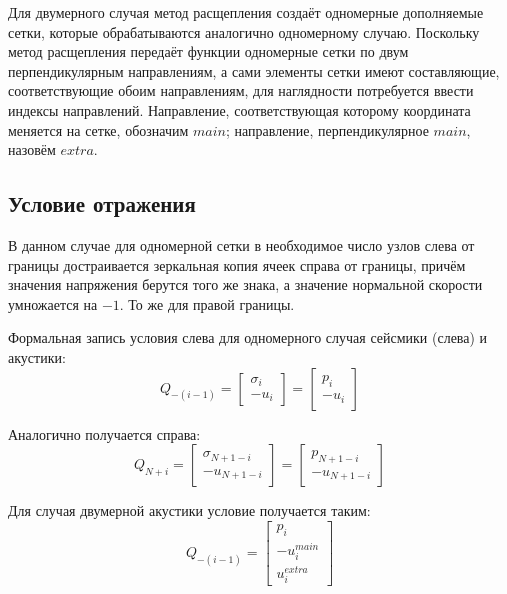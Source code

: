 \documentclass{article}
\begin{document}
\indent
Для двумерного случая метод расщепления создаёт одномерные дополняемые сетки, которые обрабатываются аналогично одномерному случаю. Поскольку метод расщепления передаёт функции одномерные сетки по двум перпендикулярным направлениям, а сами элементы сетки имеют составляющие, соответствующие обоим направлениям, для наглядности потребуется ввести индексы направлений. Направление, соответствующая которому координата меняется на сетке, обозначим $main$; направление, перпендикулярное $main$, назовём $extra$.

\subsection{Условие отражения}

\indent
В данном случае для одномерной сетки в необходимое число узлов слева от границы достраивается зеркальная копия ячеек справа от границы, причём значения напряжения берутся того же знака, а значение нормальной скорости умножается на $-1$. То же для правой границы.

\indent
Формальная запись условия слева для одномерного случая сейсмики (слева) и акустики:
$$Q_{-(i-1)} =  \left[ \begin{array}{c}
                      \sigma_i \\
                      -u_i
                      \end{array}    \right] =
                \left[ \begin{array}{c}
                      p_i \\
                      -u_i
                      \end{array}    \right] $$

\indent
Аналогично получается справа:
$$Q_{N+i} = \left[ \begin{array}{c}
                   \sigma_{N+1-i} \\
                   -u_{N+1-i}
                   \end{array}    \right] =
            \left[ \begin{array}{c}
                   p_{N+1-i} \\
                   -u_{N+1-i}
                   \end{array}    \right]$$

\indent
Для случая двумерной акустики условие получается таким:
$$Q_{-(i-1)} =  \left[ \begin{array}{c}
                      p_i \\
                      -u^{main}_{i} \\
                      u^{extra}_{i} 
                      \end{array}    \right] $$
\end{document}
